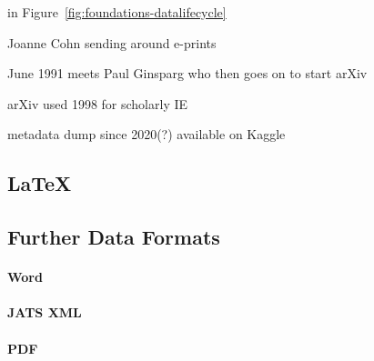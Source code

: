 in Figure~\ref{fig:foundations-datalifecycle}



Joanne Cohn sending around e-prints~\cite{Feder2021,Turner2012}

June 1991 meets Paul Ginsparg who then goes on to start arXiv~\cite{Ginsparg2011a,Ginsparg2011}

arXiv used 1998 for scholarly IE~\cite{Nanba1998}

metadata dump since 2020(?) available on Kaggle~\cite{arxiv_kaggle_dataset}

\subsection{\LaTeX}

\subsection{Further Data Formats}

\paragraph{Word}

\paragraph{JATS XML}

\paragraph{PDF}

